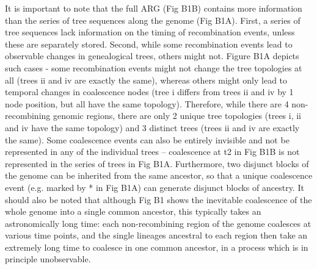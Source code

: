 \documentclass[twocolumn]{bmcart}%
\begin{document}
\begin{tcolorbox}[
  colback=blue!5!white,width=\columnwidth,colframe=blue!50!black,title= Box 1: Ancestral Recombination Graph (ARG)]
\footnotesize{It is important to note that the full ARG (Fig B1B) contains more information than the series of tree sequences along the genome (Fig B1A). First, a series of tree sequences lack information on the timing of recombination events, unless these are separately stored. Second, while some recombination events lead to observable changes in genealogical trees, others might not. Figure B1A depicts such cases - some recombination events might not change the tree topologies at all (trees ii and iv are exactly the same), whereas others might only lead to temporal changes in coalescence nodes (tree i differs from trees ii and iv by 1 node position, but all have the same topology). Therefore, while there are 4 non-recombining genomic regions, there are only 2 unique tree topologies (trees i, ii and iv have the same topology) and 3 distinct trees (trees ii and iv are exactly the same). Some coalescence events can also be entirely invisible and not be represented in any of the individual trees – coalescence at t2 in Fig B1B is not represented in the series of trees in Fig B1A. Furthermore, two disjunct blocks of the genome can be inherited from the same ancestor, so that a unique coalescence event (e.g. marked by * in Fig B1A) can generate disjunct blocks of ancestry. It should also be noted that although Fig B1 shows the inevitable coalescence of the whole genome into a single common ancestor, this typically takes an astronomically long time: each non-recombining region of the genome coalesces at various time points, and the single lineages ancestral to each region then take an extremely long time to coalesce in one common ancestor, in a process which is in principle unobservable. \\

}
\end{tcolorbox}
\end{document}
